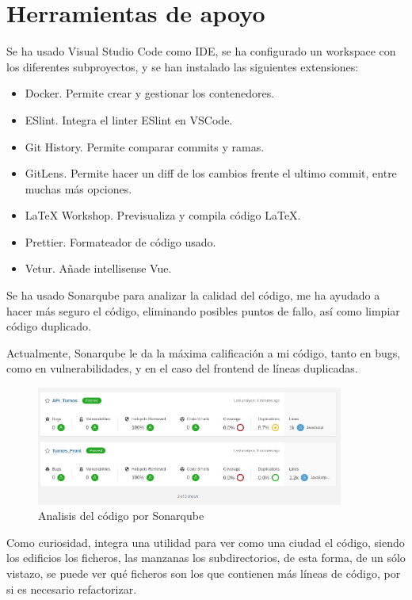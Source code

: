 \documentclass[11pt,spanish,listoffigures,listoftables]{tfgetsinf}
\begin{document}
\chapter{Herramientas de apoyo}

Se ha usado Visual Studio Code como IDE, se ha configurado un workspace con los diferentes subproyectos, y se han instalado las siguientes extensiones:
\begin{itemize}
  \item Docker. Permite crear y gestionar los contenedores.
  \item ESlint. Integra el linter ESlint en VSCode.
  \item Git History. Permite comparar commits y ramas.
  \item GitLens. Permite hacer un diff de los cambios frente el ultimo commit, entre muchas más opciones.
  \item LaTeX Workshop. Previsualiza y compila código LaTeX.
  \item Prettier. Formateador de código usado.
  \item Vetur. Añade intellisense Vue.
\end{itemize}

Se ha usado Sonarqube para analizar la calidad del código, me ha ayudado a hacer más seguro el código, eliminando posibles puntos de fallo, así como limpiar código duplicado.

Actualmente, Sonarqube le da la máxima calificación a mi código, tanto en bugs, como en vulnerabilidades, y en el caso del frontend de líneas duplicadas.

\begin{figure}[h!] %
  \centering
   \includegraphics[width=0.90\textwidth]{img/estadosonar.png}
   \caption{Analisis del código por Sonarqube}
   \label{fig:estadosonar}
 \end{figure}
\clearpage
Como curiosidad, integra una utilidad para ver como una ciudad el código, siendo los edificios los ficheros, las manzanas los subdirectorios, de esta forma, de un sólo vistazo, se puede ver qué ficheros son los que contienen más líneas de código, por si es necesario refactorizar.
\end{document}
